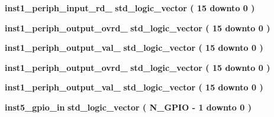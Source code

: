 \begin{DoxyCompactItemize}
\item 
{\bf inst1\+\_\+periph\+\_\+input\+\_\+rd\+\_} {\bfseries \textcolor{comment}{std\+\_\+logic\+\_\+vector}\textcolor{vhdlchar}{ }\textcolor{vhdlchar}{(}\textcolor{vhdlchar}{ }\textcolor{vhdlchar}{ } \textcolor{vhdldigit}{15} \textcolor{vhdlchar}{ }\textcolor{keywordflow}{downto}\textcolor{vhdlchar}{ }\textcolor{vhdlchar}{ } \textcolor{vhdldigit}{0} \textcolor{vhdlchar}{ }\textcolor{vhdlchar}{)}\textcolor{vhdlchar}{ }} 
\item 
{\bf inst1\+\_\+periph\+\_\+output\+\_\+ovrd\+\_} {\bfseries \textcolor{comment}{std\+\_\+logic\+\_\+vector}\textcolor{vhdlchar}{ }\textcolor{vhdlchar}{(}\textcolor{vhdlchar}{ }\textcolor{vhdlchar}{ } \textcolor{vhdldigit}{15} \textcolor{vhdlchar}{ }\textcolor{keywordflow}{downto}\textcolor{vhdlchar}{ }\textcolor{vhdlchar}{ } \textcolor{vhdldigit}{0} \textcolor{vhdlchar}{ }\textcolor{vhdlchar}{)}\textcolor{vhdlchar}{ }} 
\item 
{\bf inst1\+\_\+periph\+\_\+output\+\_\+val\+\_} {\bfseries \textcolor{comment}{std\+\_\+logic\+\_\+vector}\textcolor{vhdlchar}{ }\textcolor{vhdlchar}{(}\textcolor{vhdlchar}{ }\textcolor{vhdlchar}{ } \textcolor{vhdldigit}{15} \textcolor{vhdlchar}{ }\textcolor{keywordflow}{downto}\textcolor{vhdlchar}{ }\textcolor{vhdlchar}{ } \textcolor{vhdldigit}{0} \textcolor{vhdlchar}{ }\textcolor{vhdlchar}{)}\textcolor{vhdlchar}{ }} 
\item 
{\bf inst1\+\_\+periph\+\_\+output\+\_\+ovrd\+\_} {\bfseries \textcolor{comment}{std\+\_\+logic\+\_\+vector}\textcolor{vhdlchar}{ }\textcolor{vhdlchar}{(}\textcolor{vhdlchar}{ }\textcolor{vhdlchar}{ } \textcolor{vhdldigit}{15} \textcolor{vhdlchar}{ }\textcolor{keywordflow}{downto}\textcolor{vhdlchar}{ }\textcolor{vhdlchar}{ } \textcolor{vhdldigit}{0} \textcolor{vhdlchar}{ }\textcolor{vhdlchar}{)}\textcolor{vhdlchar}{ }} 
\item 
{\bf inst1\+\_\+periph\+\_\+output\+\_\+val\+\_} {\bfseries \textcolor{comment}{std\+\_\+logic\+\_\+vector}\textcolor{vhdlchar}{ }\textcolor{vhdlchar}{(}\textcolor{vhdlchar}{ }\textcolor{vhdlchar}{ } \textcolor{vhdldigit}{15} \textcolor{vhdlchar}{ }\textcolor{keywordflow}{downto}\textcolor{vhdlchar}{ }\textcolor{vhdlchar}{ } \textcolor{vhdldigit}{0} \textcolor{vhdlchar}{ }\textcolor{vhdlchar}{)}\textcolor{vhdlchar}{ }} 
\item 
{\bf inst5\+\_\+gpio\+\_\+in} {\bfseries \textcolor{comment}{std\+\_\+logic\+\_\+vector}\textcolor{vhdlchar}{ }\textcolor{vhdlchar}{(}\textcolor{vhdlchar}{ }\textcolor{vhdlchar}{ }\textcolor{vhdlchar}{ }\textcolor{vhdlchar}{ }{\bfseries {\bf N\+\_\+\+G\+P\+IO}} \textcolor{vhdlchar}{-\/}\textcolor{vhdlchar}{ } \textcolor{vhdldigit}{1} \textcolor{vhdlchar}{ }\textcolor{keywordflow}{downto}\textcolor{vhdlchar}{ }\textcolor{vhdlchar}{ } \textcolor{vhdldigit}{0} \textcolor{vhdlchar}{ }\textcolor{vhdlchar}{)}\textcolor{vhdlchar}{ }} 

\end{DoxyCompactItemize}
